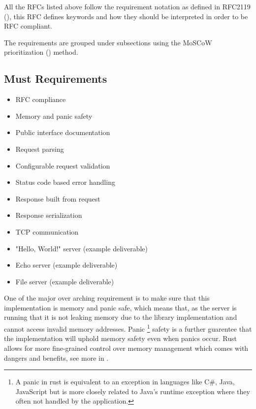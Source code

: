 \documentclass[12pt, a4paper]{article}
\begin{document}
All the RFCs listed above follow the requirement notation as defined in RFC2119 (\cite{rfc2119}),
this RFC defines keywords and how they should be interpreted in order to be RFC compliant.

The requirements are grouped under subsections using the MoSCoW prioritization (\cite{moscow}) method.

\subsection{Must Requirements}
\begin{itemize}
    \item\label{mreq:rfc-compliance} RFC compliance
    \item\label{mreq:memory-and-panic-safety} Memory and panic safety
    \item\label{mreq:public-interface-documentation} Public interface documentation
    \item\label{mreq:request-parsing} Request parsing
    \item\label{mreq:configurable-request-validation} Configurable request validation
    \item\label{mreq:status-code-based-errors} Status code based error handling
    \item\label{mreq:response-built-from-request} Response built from request
    \item\label{mreq:response-serialization} Response serialization
    \item\label{mreq:tcp-communication} TCP communication
    \item\label{mreq:example-hello-server} "Hello, World!" server (example deliverable)
    \item\label{mreq:example-echo-server} Echo server (example deliverable)
    \item\label{sreq:example-file-server} File server (example deliverable)
\end{itemize}

One of the major over arching requirement is to make sure that this implementation is memory and panic safe, which
means that, as the server is running that it is not leaking memory due to the library implementation
and cannot access invalid memory addresses. Panic \footnote{A panic in rust is equivalent to an
exception in languages like C\#, Java, JavaScript but is more closely related to Java's runtime
exception where they often not handled by the application.} safety is a further guarentee that the implementation
will uphold memory safety even when panics occur. Rust allows for more fine-grained control over
memory management which comes with dangers and benefits, see more in
\emph{}.
\end{document}
